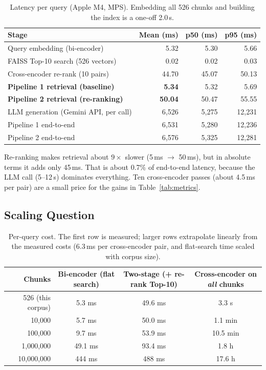 \documentclass[11pt,a4paper]{article}
\begin{document}
\begin{table}[H]
\centering\small
\begin{tabular}{lrrr}
\toprule
Stage & Mean (ms) & p50 (ms) & p95 (ms) \\
\midrule
Query embedding (bi-encoder)                 & 5.32  & 5.30  & 5.66 \\
FAISS Top-10 search (526 vectors)            & 0.02  & 0.02  & 0.03 \\
Cross-encoder re-rank (10 pairs)             & 44.70 & 45.07 & 50.13 \\
\midrule
\textbf{Pipeline 1 retrieval (baseline)}     & \textbf{5.34}  & 5.32  & 5.69 \\
\textbf{Pipeline 2 retrieval (re-ranking)}   & \textbf{50.04} & 50.47 & 55.55 \\
\midrule
LLM generation (Gemini API, per call)        & 6{,}526 & 5{,}275 & 12{,}231 \\
Pipeline 1 end-to-end                        & 6{,}531 & 5{,}280 & 12{,}236 \\
Pipeline 2 end-to-end                        & 6{,}576 & 5{,}325 & 12{,}281 \\
\bottomrule
\end{tabular}
\caption{Latency per query (Apple M4, MPS). Embedding all 526 chunks and building the index is a one-off 2.0\,s.}
\label{tab:latency}
\end{table}

Re-ranking makes retrieval about $9\times$ slower (5\,ms $\to$ 50\,ms), but in absolute terms it adds only 45\,ms.
That is about 0.7\% of end-to-end latency, because the LLM call (5--12\,s) dominates everything. Ten
cross-encoder passes (about 4.5\,ms per pair) are a small price for the gains in Table~\ref{tab:metrics}.

\subsection{Scaling Question}

\begin{table}[H]
\centering\small
\begin{tabular}{rccc}
\toprule
Chunks & Bi-encoder (flat search) & Two-stage (+ re-rank Top-10) & Cross-encoder on \emph{all} chunks \\
\midrule
526 (this corpus) & 5.3 ms  & 49.6 ms & 3.3 s \\
10,000            & 5.7 ms  & 50.0 ms & 1.1 min \\
100,000           & 9.7 ms  & 53.9 ms & 10.5 min \\
1,000,000         & 49.1 ms & 93.4 ms & 1.8 h \\
10,000,000        & 444 ms  & 488 ms  & 17.6 h \\
\bottomrule
\end{tabular}
\caption{Per-query cost. The first row is measured; larger rows extrapolate linearly from the measured costs
(6.3\,ms per cross-encoder pair, and flat-search time scaled with corpus size).}
\label{tab:scaling}
\end{table}
\end{document}
